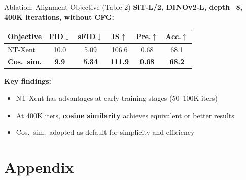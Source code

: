 \documentclass[aspectratio=169, 10pt]{beamer}
\begin{document}
\begin{frame}{Ablation: Alignment Objective (Table 2)}
\small
\textbf{SiT-L/2, DINOv2-L, depth=8, 400K iterations, without CFG:}

\vspace{0.5em}
\begin{center}
\begin{tabular}{lccccc}
\toprule
\textbf{Objective} & \textbf{FID$\downarrow$} & \textbf{sFID$\downarrow$} & \textbf{IS$\uparrow$} & \textbf{Pre.$\uparrow$} & \textbf{Acc.$\uparrow$} \\
\midrule
NT-Xent     & 10.0 & 5.09 & 106.6 & 0.68 & 68.1 \\
\textbf{Cos.\ sim.} & \textbf{9.9} & \textbf{5.34} & \textbf{111.9} & \textbf{0.68} & \textbf{68.2} \\
\bottomrule
\end{tabular}
\end{center}

\vspace{0.6em}
\textbf{Key findings:}
\begin{itemize}\setlength{\itemsep}{2pt}
  \item NT-Xent has advantages at early training stages (50--100K iters)
  \item At 400K iters, \textbf{cosine similarity} achieves equivalent or better results
  \item Cos.\ sim.\ adopted as default for simplicity and efficiency
\end{itemize}
\end{frame}

\appendix
\section*{Appendix}
\end{document}
